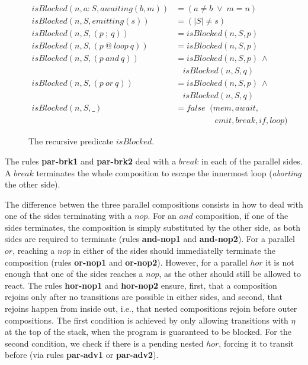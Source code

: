 \documentclass{acm_proc_article-sp}
\newcommand{\rr}[1] {{\textbf{\scriptsize{#1}}}}
\newcommand{\1}{\;}
\newcommand{\2}{\;\;}
\newcommand{\3}{\;\;\;}
\newcommand{\5}{\;\;\;\;\;}
\begin{document}
\begin{figure}[t]
{\small
\begin{align*}
  isBlocked(n,a:S, awaiting(b,m)) &= (a \neq b \1\vee\1 m = n)   \\
  isBlocked(n,S, emitting(s))    &= (|S| \neq s)                     \\
  isBlocked(n,S, (p~;~q))        &= isBlocked(n,S,p)             \\
  isBlocked(n,S, (p~@~loop~q))   &= isBlocked(n,S,p)             \\
  isBlocked(n,S, (p~and~q))      &= isBlocked(n,S,p)~\wedge
                               \\&~~~~isBlocked(n,S,q)             \\
  isBlocked(n,S, (p~or~q))       &= isBlocked(n,S,p)~\wedge
                               \\&~~~~isBlocked(n,S,q)             \\
  isBlocked(n,S, \_)             &= false \2  (mem,await,      \\
                                  &    \5\5\5\2 emit,break,if,loop)   %
\end{align*}
}%
\caption{
The recursive predicate $isBlocked$.
\label{fig.isBlocked}
}
\end{figure}

The rules \rr{par-brk1} and \rr{par-brk2} deal with a $break$ in each of the 
parallel sides.
A $break$ terminates the whole composition to escape the innermost loop 
(\emph{aborting} the other side).

The difference betwen the three parallel compositions consists in how to deal 
with one of the sides terminating with a $nop$.
%
For an $and$ composition, if one of the sides terminates, the composition is 
simply substituted by the other side, as both sides are required to terminate 
(rules \rr{and-nop1} and \rr{and-nop2}).
%
For a parallel $or$, reaching a $nop$ in either of the sides should 
immediatelly terminate the composition (rules \rr{or-nop1} and \rr{or-nop2}).
%
However, for a parallel $hor$ it is not enough that one of the sides reaches a 
$nop$, as the other should still be allowed to react.
The rules \rr{hor-nop1} and \rr{hor-nop2} ensure, first, that a composition 
rejoins only after no transitions are possible in either sides, and second, 
that rejoins happen from inside out, i.e., that nested compositions rejoin 
before outer compositions.
The first condition is achieved by only allowing transitions with $\eta$ at the 
top of the stack, when the program is guaranteed to be blocked.
For the second condition, we check if there is a pending nested $hor$, forcing 
it to transit before (via rules \rr{par-adv1} or \rr{par-adv2}).
\end{document}
